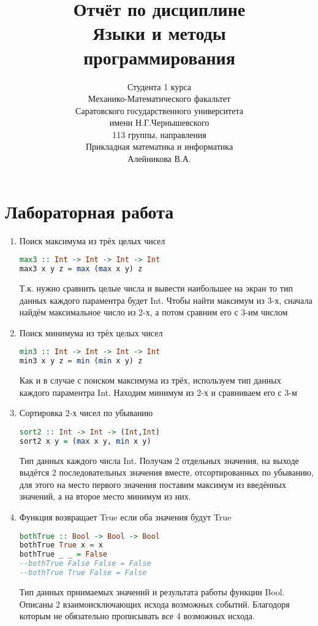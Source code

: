 \documentclass[14pt]{article}
\title{\textbf{\huge{Отчёт по дисциплине\\Языки и методы\\программирования}}}
\author{Студента 1 курса\\Механико-Математического факальтет\\Саратовского государственного университета\\имени Н.Г.Чернышевского\\113 группы, направления\\Прикладная математика и информатика\\Алейникова В.А.}
\begin{document}
\maketitle

\section{Лабораторная работа}
\begin{enumerate}

\item Поиск максимума из трёх целых чисел

\begin{lstlisting}[language=haskell]
max3 :: Int -> Int -> Int -> Int
max3 x y z = max (max x y) z
\end{lstlisting}
Т.к. нужно сравнить целые числа и вывести наибольшее на экран то тип данных каждого параментра будет Int. Чтобы найти максимум из 3-х, сначала найдём максимальное число из 2-х, а потом сравним его с 3-им числом

\item Поиск минимума из трёх целых чисел

\begin{lstlisting}[language=haskell]
min3 :: Int -> Int -> Int -> Int
min3 x y z = min (min x y) z
\end{lstlisting}
Как и в случае с поиском максимума из трёх, используем тип данных каждого параментра Int. Находим минимум из 2-х и сравниваем его с 3-м

\item Сортировка 2-х чисел по убыванию
\begin{lstlisting}[language=haskell]
sort2 :: Int -> Int -> (Int,Int)
sort2 x y = (max x y, min x y)
\end{lstlisting}
Тип данных каждого числа Int. Получам 2 отдельных значения, на выходе выдётся 2 последовательных значения вместе, отсортированных по убыванию, для этого на место первого значения поставим максимум из введённых значений, а на второе место минимум из них.

\item Функция возвращает True если оба значения будут True

\begin{lstlisting}[language=haskell]
bothTrue :: Bool -> Bool -> Bool
bothTrue True x = x
bothTrue _ _ = False
--bothTrue False False = False
--bothTrue True False = False
\end{lstlisting}
Тип данных прнимаемых значений и результата работы функции Bool. Описаны 2 взаимоисключающих исхода возможных событий. Благодоря которым не обязательно прописывать все 4 возможных исхода. 


\end{enumerate}
\end{document}
